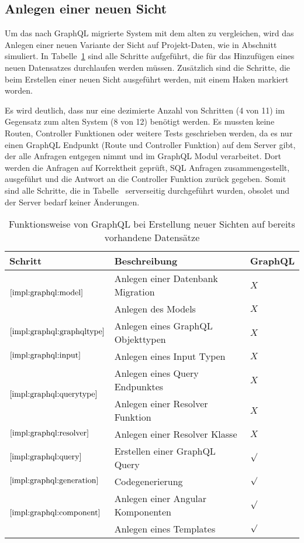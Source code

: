 \subsection{Anlegen einer neuen Sicht}
Um das nach GraphQL migrierte System mit dem alten zu vergleichen, wird das Anlegen einer neuen Variante der Sicht auf Projekt-Daten, wie in Abschnitt~ simuliert.
In Tabelle~\ref{impl:tbl:newview} sind alle Schritte aufgeführt, die für das Hinzufügen eines neuen Datensatzes durchlaufen werden müssen.
Zusätzlich sind die Schritte, die beim Erstellen einer neuen Sicht ausgeführt werden, mit einem Haken markiert worden.

Es wird deutlich, dass nur eine dezimierte Anzahl von Schritten (4 von 11) im Gegensatz zum alten System (8 von 12) benötigt werden.
Es mussten keine Routen, Controller Funktionen oder weitere Tests geschrieben werden, da es nur einen GraphQL Endpunkt (Route und Controller Funktion) auf dem Server gibt, der alle Anfragen entgegen nimmt und im GraphQL Modul verarbeitet. Dort werden die Anfragen auf Korrektheit geprüft,
SQL Anfragen zusammengestellt, ausgeführt und die Antwort an die Controller Funktion zurück gegeben.
Somit sind alle Schritte, die in Tabelle~ serverseitig durchgeführt wurden, obsolet und der Server bedarf keiner Änderungen.

\begin{table}[h!]
	\begin{tabular}{|p{}|p{}|p{}|}
		\hline
		\textbf{Schritt} & \textbf{Beschreibung} & \textbf{GraphQL} \\ \hline
		\multirow{2}{*}{$\ref{impl:graphql:model}$}
			& Anlegen einer Datenbank Migration & $X$ \\
			& Anlegen des Models & $X$ \\ \hline
		$\ref{impl:graphql:graphqltype}$ & Anlegen eines GraphQL Objekttypen &  $X$ \\ \hline
		$\ref{impl:graphql:input}$ & Anlegen eines Input Typen &  $X$ \\ \hline
		\multirow{2}{*}{$\ref{impl:graphql:querytype}$}
			& Anlegen eines Query Endpunktes &  $X$ \\ 
			& Anlegen einer Resolver Funktion &  $X$ \\ \hline
		$\ref{impl:graphql:resolver}$ & Anlegen einer Resolver Klasse &  $X$ \\ \hline
		$\ref{impl:graphql:query}$ & Erstellen einer GraphQL Query &  $\surd$ \\ \hline
		$\ref{impl:graphql:generation}$ & Codegenerierung &  $\surd$ \\ \hline
		\multirow{2}{*}{$\ref{impl:graphql:component}$}
			& Anlegen einer Angular Komponenten & $\surd$ \\
			& Anlegen eines Templates & $\surd$ \\ \hline
	\end{tabular}
	\vspace{5pt}
	\centering
	\caption{Funktionsweise von GraphQL bei Erstellung neuer Sichten auf bereits vorhandene Datensätze}
	\label{impl:tbl:newview}
\end{table}


